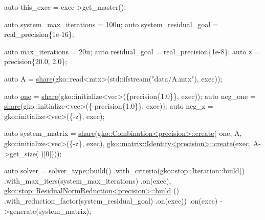 \begin{DoxyCodeInclude}
    \textcolor{keyword}{auto} this\_exec = exec->get\_master();

    \textcolor{keyword}{auto} system\_max\_iterations = 100u;
    \textcolor{keyword}{auto} system\_residual\_goal = real\_precision\{1e-16\};

    \textcolor{keyword}{auto} max\_iterations = 20u;
    \textcolor{keyword}{auto} residual\_goal = real\_precision\{1e-8\};
    \textcolor{keyword}{auto} z = precision\{20.0, 2.0\};

    \textcolor{keyword}{auto} A = \hyperlink{namespacegko_a3ce296f73db0ff398bdea6009a3a5c58}{share}(gko::read<mtx>(std::ifstream(\textcolor{stringliteral}{"data/A.mtx"}), exec));

    \textcolor{keyword}{auto} \hyperlink{namespacegko_a0059e27f8f4bc348ff65c1e60caf47c8}{one} = \hyperlink{namespacegko_a3ce296f73db0ff398bdea6009a3a5c58}{share}(gko::initialize<vec>(\{precision\{1.0\}\}, exec));
    \textcolor{keyword}{auto} neg\_one = \hyperlink{namespacegko_a3ce296f73db0ff398bdea6009a3a5c58}{share}(gko::initialize<vec>(\{-precision\{1.0\}\}, exec));
    \textcolor{keyword}{auto} neg\_z = gko::initialize<vec>(\{-z\}, exec);

    \textcolor{keyword}{auto} system\_matrix = \hyperlink{namespacegko_a3ce296f73db0ff398bdea6009a3a5c58}{share}(\hyperlink{classgko_1_1Combination}{gko::Combination<precision>::create}(
        one, A, gko::initialize<vec>(\{-z\}, exec),
        \hyperlink{classgko_1_1matrix_1_1Identity}{gko::matrix::Identity<precision>::create}(exec, A->get\_size(
      )[0])));

    \textcolor{keyword}{auto} solver =
        solver\_type::build()
            .with\_criteria(gko::stop::Iteration::build()
                               .with\_max\_iters(system\_max\_iterations)
                               .on(exec),
                           \hyperlink{classgko_1_1stop_1_1ResidualNormReduction}{gko::stop::ResidualNormReduction<precision>::build}
      ()
                               .with\_reduction\_factor(system\_residual\_goal)
                               .on(exec))
            .on(exec)
            ->generate(system\_matrix);



\end{DoxyCodeInclude}
